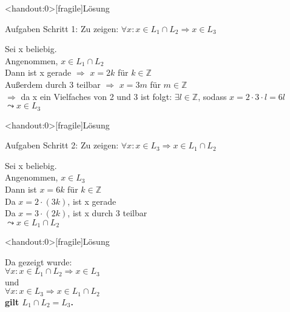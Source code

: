 {
\begin{frame}<handout:0>[fragile]{Lösung}
    \begin{alertblock}{Aufgaben}
   Schritt 1: Zu zeigen: $\forall x: x \in L_1 \cap L_2 \Rightarrow x \in L_3$
\end{alertblock}
    
    Sei x beliebig.\\
    Angenommen, $x \in L_1 \cap L_2$\\
    Dann ist x gerade $\Rightarrow$ $x= 2k$ für $k \in \mathbb{Z}$\\
    Außerdem durch 3 teilbar $\Rightarrow$ $x= 3m$ für $m \in \mathbb{Z}$\\
    $\Rightarrow$ da x ein Vielfaches von 2 und 3 ist folgt: $\exists l \in \mathbb{Z}$, sodass $x=2\cdot 3 \cdot l = 6l$\\
    $\leadsto x \in L_3$


   
\end{frame}
}
{
\begin{frame}<handout:0>[fragile]{Lösung}
    \begin{alertblock}{Aufgaben}
   Schritt 2: Zu zeigen: $\forall x: x \in L_3 \Rightarrow x \in L_1 \cap L_2$\\
\end{alertblock}
    
    Sei x beliebig.\\
    Angenommen, $x \in L_3$\\
    Dann ist $x = 6k$ für $k \in \mathbb{Z}$\\
    Da $x = 2 \cdot (3k)$, ist x gerade\\
    Da $x= 3 \cdot (2k)$, ist x durch 3 teilbar\\
    $\leadsto x \in L_1 \cap L_2$


    
\end{frame}
}

{
\begin{frame}<handout:0>[fragile]{Lösung}
      
     
    Da gezeigt wurde:\\
       \vspace{0.3cm}
    $\forall x: x \in L_1 \cap L_2 \Rightarrow x \in L_3$\\
    \alert{und}\\
    $\forall x: x \in L_3 \Rightarrow x \in L_1 \cap L_2$\\
    \vspace{0.3cm}
    \textbf{gilt $L_1 \cap L_2 = L_3$.}
    
 
\end{frame}
}

